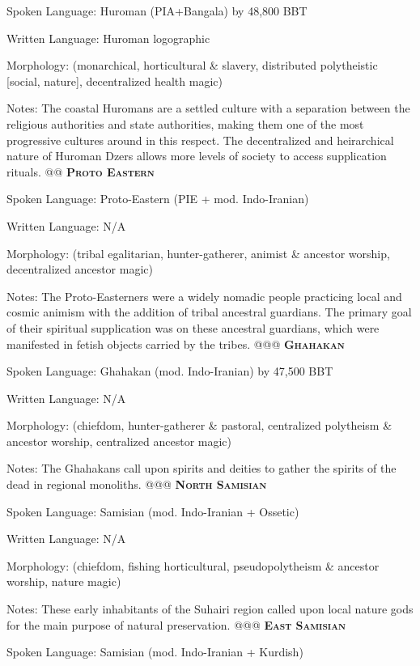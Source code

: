 \documentclass[12pt]{article}
\begin{document}
\begin{easylist}
	\normalfont Spoken Language: Huroman (PIA+Bangala) by 48,800 BBT
	
	Written Language: Huroman logographic
	
	Morphology: (monarchical, horticultural \& slavery, distributed polytheistic [social, nature], decentralized health magic)
	
	{\footnotesize Notes: The coastal Huromans are a settled culture with a separation between the religious authorities and state authorities, making them one of the most progressive cultures around in this respect. The decentralized and heirarchical nature of Huroman Dzers allows more levels of society to access supplication rituals.}
	@@ \textsc{\textbf{Proto Eastern}}
	
	\normalfont Spoken Language: Proto-Eastern (PIE + mod. Indo-Iranian)
	
	Written Language: N/A
	
	Morphology: (tribal egalitarian, hunter-gatherer, animist \& ancestor worship, decentralized ancestor magic)
	
	{\footnotesize Notes: The Proto-Easterners were a widely nomadic people practicing local and cosmic animism with the addition of tribal ancestral guardians. The primary goal of their spiritual supplication was on these ancestral guardians, which were manifested in fetish objects carried by the tribes.}
	@@@ \textsc{\textbf{Ghahakan}}
	
	\normalfont Spoken Language: Ghahakan (mod. Indo-Iranian) by 47,500 BBT
	
	Written Language: N/A
	
	Morphology: (chiefdom, hunter-gatherer \& pastoral, centralized polytheism \& ancestor worship, centralized ancestor magic)
	
	{\footnotesize Notes: The Ghahakans call upon spirits and deities to gather the spirits of the dead in regional monoliths.}
	@@@ \textsc{\textbf{North Samisian}}
	
	\normalfont Spoken Language: Samisian (mod. Indo-Iranian + Ossetic)
	
	Written Language: N/A
	
	Morphology: (chiefdom, fishing horticultural, pseudopolytheism \& ancestor worship, nature magic)
	
	{\footnotesize Notes: These early inhabitants of the Suhairi region called upon local nature gods for the main purpose of natural preservation.}
	@@@ \textsc{\textbf{East Samisian}}
	
	\normalfont Spoken Language: Samisian (mod. Indo-Iranian + Kurdish)
	

\end{easylist}
\end{document}
